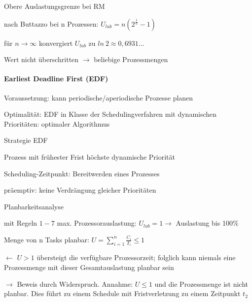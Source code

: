 \documentclass[a4paper]{article}
\begin{document}
\begin{multicols}{3}
\begin{itemize*}
\begin{itemize*}
        \end{itemize*}
        \item Obere Auslastungsgrenze bei RM
        \begin{itemize*}
            \item nach Buttazzo bei n Prozessen: $U_{lub}=n(2^{\frac{1}{n}}-1)$
            \item für $n\rightarrow\infty$ konvergiert $U_{lub}$ zu $ln\ 2 \approx 0,6931...$
            \item Wert nicht überschritten $\rightarrow$ beliebige Prozessmengen
        \end{itemize*}
    \end{itemize*}

    \paragraph{Earliest Deadline First (EDF)}
    \begin{itemize*}
        \item Voraussetzung: kann periodische/aperiodische Prozesse planen
        \item Optimalität: EDF in Klasse der Schedulingverfahren mit dynamischen Prioritäten: optimaler Algorithmus
        \item Strategie EDF
        \begin{itemize*}
            \item Prozess mit frühester Frist höchste dynamische Priorität
            \item Scheduling-Zeitpunkt: Bereitwerden eines Prozesses
            \item präemptiv: keine Verdrängung gleicher Prioritäten
        \end{itemize*}
        \item Planbarkeitsanalyse
        \begin{itemize*}
            \item mit Regeln $1-7$ max. Prozessorauslastung: $U_{lub}= 1\rightarrow$ Auslastung bis 100\%
            \item Menge von n Tasks planbar: $U=\sum_{i=1}^n \frac{C_i}{T_i}\leq 1$
            \item[$\leftarrow$] $U>1$ übersteigt die verfügbare Prozessorzeit; folglich kann niemals eine Prozessmenge mit dieser Gesamtauslastung planbar sein
            \item[$\rightarrow$] Beweis durch Widerspruch. Annahme: $U\leq 1$ und die Prozessmenge ist nicht planbar. Dies führt zu einem Schedule mit Fristverletzung zu einem Zeitpunkt $t_2$
        \end{itemize*}
    \end{itemize*}


\end{multicols}
\end{document}
